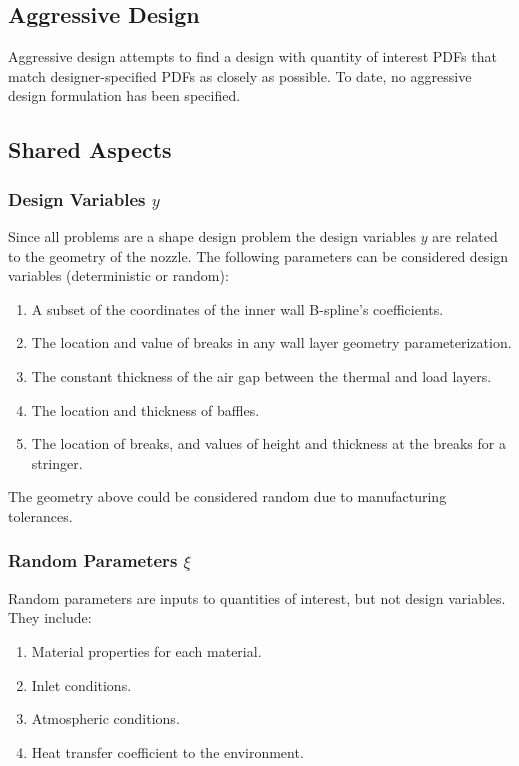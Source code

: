 \documentclass{article}
\begin{document}
\subsection{Aggressive Design}

Aggressive design attempts to find a design with quantity of interest PDFs that match designer-specified PDFs as closely as possible. To date, no aggressive design formulation has been specified.

\subsection{Shared Aspects}

\subsubsection{Design Variables $y$}

Since all problems are a shape design problem the design variables $y$ are related to the geometry of the nozzle. The following parameters can be considered design variables (deterministic or random):

\begin{enumerate}
\item A subset of the coordinates of the inner wall B-spline's coefficients.
\item The location and value of breaks in any wall layer geometry parameterization.
\item The constant thickness of the air gap between the thermal and load layers.
\item The location and thickness of baffles.
\item The location of breaks, and values of height and thickness at the breaks for a stringer.
\end{enumerate}

The geometry above could be considered random due to manufacturing tolerances.

\subsubsection{Random Parameters $\xi$}

Random parameters are inputs to quantities of interest, but not design variables. They include:

\begin{enumerate}
\item Material properties for each material.
\item Inlet conditions.
\item Atmospheric conditions.
\item Heat transfer coefficient to the environment.
\end{enumerate}
\end{document}
